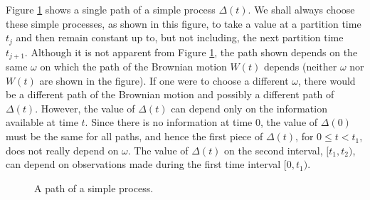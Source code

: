 \documentclass[\topdir/lecture\_notes.tex]{subfiles}
\begin{document}
Figure \ref{fig:simple_process} shows a single path of a simple process \(\Delta(t)\). We shall always choose these simple processes, as shown in this figure, to take a value at a partition time \(t_{j}\) and then remain constant up to, but not including, the next partition time \(t_{j+1}\). Although it is not apparent from Figure \ref{fig:simple_process}, the path shown depends on the same \(\omega\) on which the path of the Brownian motion \(W(t)\) depends (neither \(\omega\) nor \(W(t)\) are shown in the figure). If one were to choose a different \(\omega\), there would be a different path of the Brownian motion and possibly a different path of \(\Delta(t)\). However, the value of \(\Delta(t)\) can depend only on the information available at time \(t\). Since there is no information at time \(0\), the value of \(\Delta(0)\) must be the same for all paths, and hence the first piece of \(\Delta(t)\), for \(0 \leq t<t_{1}\), does not really depend on \(\omega\). The value of \(\Delta(t)\) on the second interval, \([t_{1}, t_{2})\), can depend on observations made during the first time interval \([0, t_{1})\).
\begin{figure}
    \begin{center}

    \end{center}
    \caption{A path of a simple process.}
    \label{fig:simple_process}
\end{figure}
\end{document}
